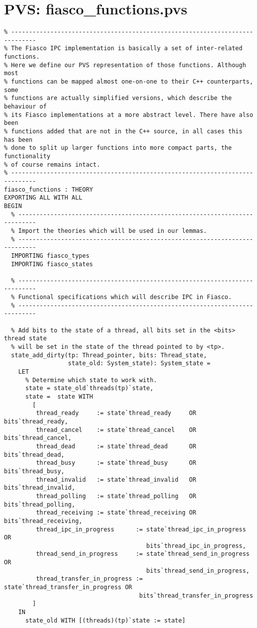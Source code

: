 \hypertarget{pvs_fiasco_functions}{\chapter{PVS: fiasco\_functions.pvs}}
\lstset{language=PVS}
\begin{lstlisting}
% -----------------------------------------------------------------------------
% The Fiasco IPC implementation is basically a set of inter-related functions.
% Here we define our PVS representation of those functions. Although most 
% functions can be mapped almost one-on-one to their C++ counterparts, some
% functions are actually simplified versions, which describe the behaviour of
% its Fiasco implementations at a more abstract level. There have also been 
% functions added that are not in the C++ source, in all cases this has been 
% done to split up larger functions into more compact parts, the functionality 
% of course remains intact.
% -----------------------------------------------------------------------------
fiasco_functions : THEORY
EXPORTING ALL WITH ALL
BEGIN
  % ---------------------------------------------------------------------------
  % Import the theories which will be used in our lemmas.
  % ---------------------------------------------------------------------------
  IMPORTING fiasco_types
  IMPORTING fiasco_states

  % ---------------------------------------------------------------------------
  % Functional specifications which will describe IPC in Fiasco.
  % ---------------------------------------------------------------------------  

  % Add bits to the state of a thread, all bits set in the <bits> thread state
  % will be set in the state of the thread pointed to by <tp>.
  state_add_dirty(tp: Thread_pointer, bits: Thread_state, 
                  state_old: System_state): System_state =
    LET
      % Determine which state to work with.
      state = state_old`threads(tp)`state,
      state =  state WITH 
        [
         thread_ready     := state`thread_ready     OR bits`thread_ready,
         thread_cancel    := state`thread_cancel    OR bits`thread_cancel,
         thread_dead      := state`thread_dead      OR bits`thread_dead,
         thread_busy      := state`thread_busy      OR bits`thread_busy,
         thread_invalid   := state`thread_invalid   OR bits`thread_invalid,
         thread_polling   := state`thread_polling   OR bits`thread_polling,
         thread_receiving := state`thread_receiving OR bits`thread_receiving,
         thread_ipc_in_progress      := state`thread_ipc_in_progress OR
                                        bits`thread_ipc_in_progress,
         thread_send_in_progress     := state`thread_send_in_progress OR
                                        bits`thread_send_in_progress,
         thread_transfer_in_progress := state`thread_transfer_in_progress OR
                                      bits`thread_transfer_in_progress
        ]
    IN
      state_old WITH [(threads)(tp)`state := state]


\end{lstlisting}
